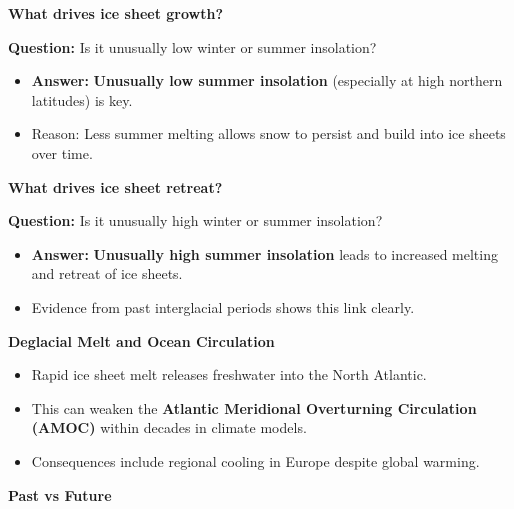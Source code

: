 \documentclass[fontsize=8pt, a4paper, landscape, fleqn]{scrartcl}
\renewcommand{\subsection}[1]{%
    \noindent\colorbox{subsectioncolor}{%
        \parbox{\dimexpr\columnwidth-2\fboxsep}{\color{white}\textbf{#1}}}%
    \vspace{0.5mm}%
}
\begin{document}
\begin{multicols*}{3}[\raggedcolumns]
\subsection{What drives ice sheet growth?}

\textbf{Question:} Is it unusually low winter or summer insolation?

\begin{itemize}
    \item \textbf{Answer:} \textbf{Unusually low summer insolation} (especially at high northern latitudes) is key.
    \item Reason: Less summer melting allows snow to persist and build into ice sheets over time.
\end{itemize}

\subsection{What drives ice sheet retreat?}

\textbf{Question:} Is it unusually high winter or summer insolation?

\begin{itemize}
    \item \textbf{Answer:} \textbf{Unusually high summer insolation} leads to increased melting and retreat of ice sheets.
    \item Evidence from past interglacial periods shows this link clearly.
\end{itemize}

\subsection{Deglacial Melt and Ocean Circulation}

\begin{itemize}
    \item Rapid ice sheet melt releases freshwater into the North Atlantic.
    \item This can weaken the \textbf{Atlantic Meridional Overturning Circulation (AMOC)} within decades in climate models.
    \item Consequences include regional cooling in Europe despite global warming.
\end{itemize}

\subsection{Past vs Future}


\end{multicols*}
\end{document}
